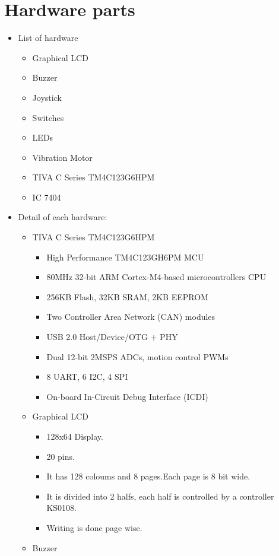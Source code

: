 \documentclass[a4paper,12pt,oneside]{book}
\begin{document}
\chapter{Hardware parts}
\begin{itemize}
  \item List of hardware 
  \begin{itemize}
    \item Graphical LCD
    \item Buzzer
    \item Joystick
    \item Switches
    \item LEDs
    \item Vibration Motor
    \item TIVA C Series TM4C123G6HPM
    \item  IC 7404
  \end{itemize}
  \item Detail of each hardware:
      \begin{itemize}
  \item TIVA C Series TM4C123G6HPM
  \begin{itemize}
    \item High Performance TM4C123GH6PM MCU
    \item 80MHz 32-bit ARM Cortex-M4-based microcontrollers CPU
    \item 256KB Flash, 32KB SRAM, 2KB EEPROM
    \item Two Controller Area Network (CAN) modules
    \item USB 2.0 Host/Device/OTG + PHY
    \item Dual 12-bit 2MSPS ADCs, motion control PWMs
    \item 8 UART, 6 I2C, 4 SPI
    \item On-board In-Circuit Debug Interface (ICDI)
  \end{itemize}
    \item Graphical LCD
    \begin{itemize}
      \item 128x64 Display.
      \item 20 pins.
      \item It has 128 coloums and 8 pages.Each page is 8 bit wide.
      \item It is divided into 2 halfs, each half is controlled by a controller KS0108.
      \item Writing is done page wise.
    \end{itemize}
    \item Buzzer

\end{itemize}
\end{itemize}
\end{document}
